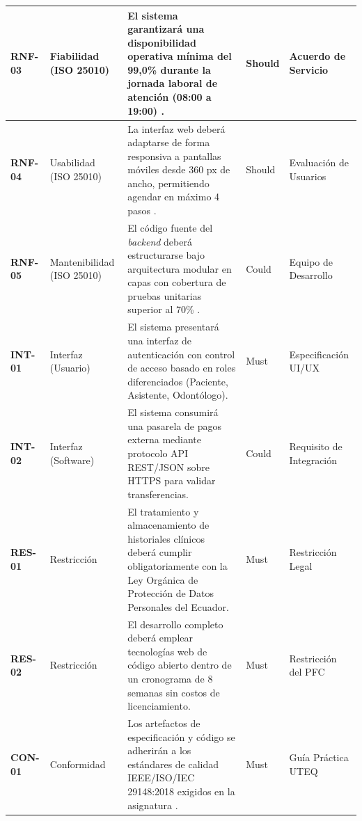 \documentclass[11pt,a4paper]{article}
\begin{document}
\begin{xltabular}{\textwidth}{|p{0.10\textwidth}|p{0.15\textwidth}|X|p{0.11\textwidth}|p{0.18\textwidth}|}
\textbf{RNF-03} & Fiabilidad \newline (ISO 25010) & El sistema garantizará una disponibilidad operativa mínima del 99,0\% durante la jornada laboral de atención (08:00 a 19:00) \cite{iso25010}. & Should & Acuerdo de Servicio \\ \hline

\textbf{RNF-04} & Usabilidad \newline (ISO 25010) & La interfaz web deberá adaptarse de forma responsiva a pantallas móviles desde 360 px de ancho, permitiendo agendar en máximo 4 pasos \cite{iso25010}. & Should & Evaluación de Usuarios \\ \hline

\textbf{RNF-05} & Mantenibilidad \newline (ISO 25010) & El código fuente del \textit{backend} deberá estructurarse bajo arquitectura modular en capas con cobertura de pruebas unitarias superior al 70\% \cite{iso25010}. & Could & Equipo de Desarrollo \\ \hline

\textbf{INT-01} & Interfaz \newline (Usuario) & El sistema presentará una interfaz de autenticación con control de acceso basado en roles diferenciados (Paciente, Asistente, Odontólogo). & Must & Especificación UI/UX \\ \hline

\textbf{INT-02} & Interfaz \newline (Software) & El sistema consumirá una pasarela de pagos externa mediante protocolo API REST/JSON sobre HTTPS para validar transferencias. & Could & Requisito de Integración \\ \hline

\textbf{RES-01} & Restricción & El tratamiento y almacenamiento de historiales clínicos deberá cumplir obligatoriamente con la Ley Orgánica de Protección de Datos Personales del Ecuador. & Must & Restricción Legal \\ \hline

\textbf{RES-02} & Restricción & El desarrollo completo deberá emplear tecnologías web de código abierto dentro de un cronograma de 8 semanas sin costos de licenciamiento. & Must & Restricción del PFC \\ \hline

\textbf{CON-01} & Conformidad & Los artefactos de especificación y código se adherirán a los estándares de calidad IEEE/ISO/IEC 29148:2018 exigidos en la asignatura \cite{ieee29148}. & Must & Guía Práctica UTEQ \\ \hline
\end{xltabular}
\endgroup
\end{document}

